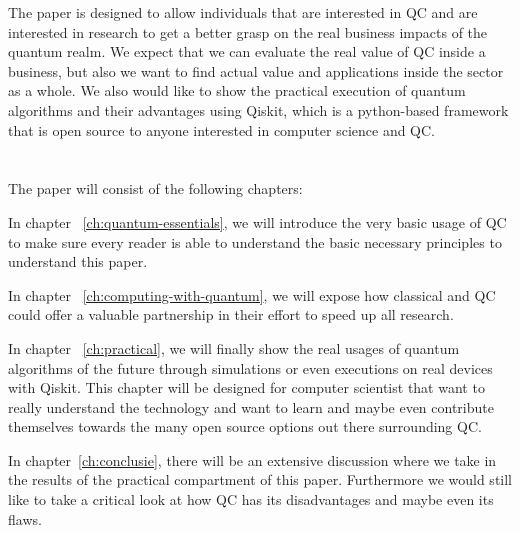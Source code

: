 The paper is designed to allow individuals that are interested in QC and are interested in research to get a better grasp on the real business impacts of the quantum realm. We expect that we can evaluate the real value of QC inside a business, but also we want to find actual value and applications inside the sector as a whole. We also would like to show the practical execution of quantum algorithms and their advantages using Qiskit, which is a python-based framework that is open source to anyone interested in computer science and QC.

\section{}
\label{sec:opzet-bachelorproef}


The paper will consist of the following chapters:

In chapter ~\ref{ch:quantum-essentials}, we will introduce the very basic usage of QC to make sure every reader is able to understand the basic necessary principles to understand this paper.

In chapter ~\ref{ch:computing-with-quantum}, we will expose how classical and QC could offer a valuable partnership in their effort to speed up all research. 

In chapter ~\ref{ch:practical}, we will finally show the real usages of quantum algorithms of the future through simulations or even executions on real devices with Qiskit. This chapter will be designed for computer scientist that want to really understand the technology and want to learn and maybe even contribute themselves towards the many open source options out there surrounding QC.

In chapter~\ref{ch:conclusie}, there will be an extensive discussion where we take in the results of the practical compartment of this paper. Furthermore we would still like to take a critical look at how QC has its disadvantages and maybe even its flaws. 
